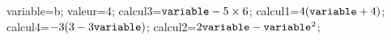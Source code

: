\documentclass[exercice]{thedocument}%
\begin{document}
%
    \>variable=b;%
    \>valeur=4;%
    \>calcul3=${\<variable;}-5\times6$;%
    \>calcul1=$4({\<variable;}+4)$;%
    \>calcul4=$-3(3-3{\<variable;})$;%
    \>calcul2=$2{\<variable;}-{\<variable;}^2$;%
\end{document}
